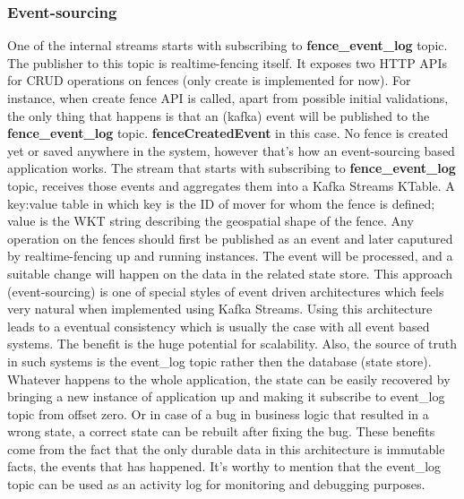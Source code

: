 \documentclass[a4]{report}
\begin{document}
    \subsubsection{Event-sourcing}
    One of the internal streams starts with subscribing to \textbf{fence\_event\_log} topic.
    The publisher to this topic is realtime-fencing itself.
    It exposes two HTTP APIs for CRUD operations on fences (only create is implemented for now).
    For instance, when create fence API is called, apart from possible initial validations, the
    only thing that happens is that an (kafka) event will be published to the \textbf{fence\_event\_log} topic.
    \textbf{fenceCreatedEvent} in this case.
    No fence is created yet or saved anywhere in the system, however that's how an event-sourcing based application
    works.
    The stream that starts with subscribing to \textbf{fence\_event\_log} topic, receives those events and aggregates
    them into a Kafka Streams KTable.
    A key:value table in which key is the ID of mover for whom the fence is defined;
    value is the WKT string describing the geospatial shape of the fence.
    Any operation on the fences should first be published as an event and later caputured by realtime-fencing up and
    running instances.
    The event will be processed, and a suitable change will happen on the data in the related state store.
    This approach (event-sourcing) is one of special styles of event driven architectures which feels very natural
    when implemented using Kafka Streams.
    Using this architecture leads to a eventual consistency which is usually the case with all event based systems.
    The benefit is the huge potential for scalability.
    Also, the source of truth in such systems is the event\_log topic rather then the database (state store).
    Whatever happens to the whole application, the state can be easily recovered by bringing a new instance of
    application up and making it subscribe to event\_log topic from offset zero.
    Or in case of a bug in business logic that resulted in a wrong state, a correct state can be rebuilt after fixing
    the bug.
    These benefits come from the fact that the only durable data in this architecture is immutable facts, the
    events that has happened.
    It's worthy to mention that the event\_log topic can be used as an activity log for monitoring and debugging purposes.
\end{document}
